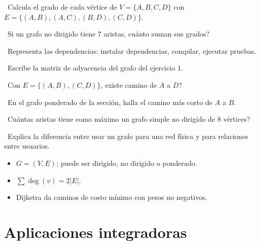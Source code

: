 \begin{tmejercicios}
\label{ej:2-6}
\begin{tmlista}
\item \tmbasico\ Calcula el grado de cada v\'ertice de $V=\{A, B, C, D\}$ con $E=\{(A, B),(A, C),(B, D),(C, D)\}$.
\item \tmbasico\ Si un grafo no dirigido tiene 7 aristas, \textquestiondown cu\'anto suman sus grados?
\item \tmbasico\ Representa las dependencias: instalar dependencias, compilar, ejecutar pruebas.
\item \tmmedio\ Escribe la matriz de adyacencia del grafo del ejercicio 1.
\item \tmmedio\ Con $E=\{(A, B),(C, D)\}$, \textquestiondown existe camino de $A$ a $D$?
\item \tmmedio\ En el grafo ponderado de la secci\'on, halla el camino m\'as corto de $A$ a $B$.
\item \tmdificil\ \textquestiondown Cu\'antas aristas tiene como m\'aximo un grafo simple no dirigido de 8 v\'ertices?
\item \tmdificil\ Explica la diferencia entre usar un grafo para una red f\'isica y para relaciones entre usuarios.
\end{tmlista}
\end{tmejercicios}


\begin{tmresumen}
\begin{itemize}
\item $G=(V, E)$; puede ser dirigido, no dirigido o ponderado.
\item $\sum\deg(v)=2|E|$.
\item Dijkstra da caminos de costo m\'inimo con pesos no negativos.
\end{itemize}
\end{tmresumen}

\section{Aplicaciones integradoras}
\label{sec:2-7}

